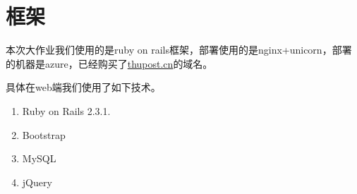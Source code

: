 \section{框架}
本次大作业我们使用的是ruby on rails框架，部署使用的是nginx+unicorn，部署的机器是azure，已经购买了\url{thupost.cn}的域名。

具体在web端我们使用了如下技术。

\begin{enumerate}
    \item Ruby on Rails 2.3.1.
    \item Bootstrap
    \item MySQL
    \item jQuery
\end{enumerate}
